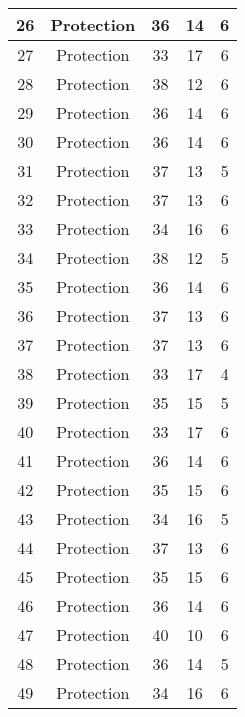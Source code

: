 \documentclass[results.tex]{subfiles}
\begin{document}
\begin{center}
\begin{tabular}{| c || c | c | c | c |}
    \hline
    26 & Protection & 36 & 14 & 6 \\ 
    \hline
    27 & Protection & 33 & 17 & 6 \\ 
    \hline
    28 & Protection & 38 & 12 & 6 \\ 
    \hline
    29 & Protection & 36 & 14 & 6 \\ 
    \hline
    30 & Protection & 36 & 14 & 6 \\ 
    \hline
    31 & Protection & 37 & 13 & 5 \\ 
    \hline
    32 & Protection & 37 & 13 & 6 \\ 
    \hline
    33 & Protection & 34 & 16 & 6 \\ 
    \hline
    34 & Protection & 38 & 12 & 5 \\ 
    \hline
    35 & Protection & 36 & 14 & 6 \\ 
    \hline
    36 & Protection & 37 & 13 & 6 \\ 
    \hline
    37 & Protection & 37 & 13 & 6 \\ 
    \hline
    38 & Protection & 33 & 17 & 4 \\ 
    \hline
    39 & Protection & 35 & 15 & 5 \\ 
    \hline
    40 & Protection & 33 & 17 & 6 \\ 
    \hline
    41 & Protection & 36 & 14 & 6 \\ 
    \hline
    42 & Protection & 35 & 15 & 6 \\ 
    \hline
    43 & Protection & 34 & 16 & 5 \\ 
    \hline
    44 & Protection & 37 & 13 & 6 \\ 
    \hline
    45 & Protection & 35 & 15 & 6 \\ 
    \hline
    46 & Protection & 36 & 14 & 6 \\ 
    \hline
    47 & Protection & 40 & 10 & 6 \\ 
    \hline
    48 & Protection & 36 & 14 & 5 \\ 
    \hline
    49 & Protection & 34 & 16 & 6 \\ 
    \hline   \end{tabular}
\end{center}
\end{document}
